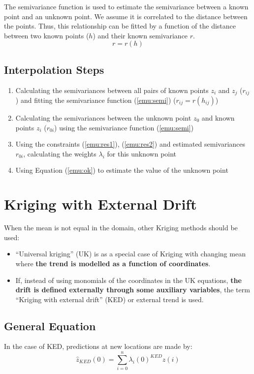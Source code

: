 \documentclass{article}
\begin{document}
The semivariance function is used to estimate the semivariance between a known point and an unknown point. We assume it is correlated to the distance between the points. Thus, this relationship can be fitted by a function of the distance between two known points ($h$) and their known semivariance $r$. 
\begin{equation}
\label{emu:semi}
    r=r(h)
\end{equation}

\subsection{Interpolation Steps}
\begin{enumerate}[1)]
    \item Calculating the semivariances between all pairs of known points $z_i$ and $z_j$ ($r_{ij}$) and fitting the semivariance function (\ref{emu:semi}) ($r_{ij}=r(h_{ij})$)
    \item Calculating the semivariances between the unknown point $z_0$ and known points $z_i$ ($r_{0i}$) using the semivariance function (\ref{emu:semi})
    \item Using the constraints (\ref{emu:res1}), (\ref{emu:res2}) and estimated semivariances $r_{0i}$, calculating the weights $\lambda_i$ for this unknown point
    \item Using Equation (\ref{emu:ok}) to estimate the value of the unknown point
\end{enumerate}

\section{Kriging with External Drift}

When the mean is not equal in the domain, other Kriging methods should be used:
\begin{itemize}
    \item “Universal kriging” (UK) is as a special case of Kriging with changing mean where \textbf{the trend is modelled as a function of coordinates}. 
    \item If, instead of using monomials of the coordinates in the UK equations, \textbf{the drift is defined externally through some auxiliary variables}, the term “Kriging with external drift” (KED) or external trend is used.
\end{itemize}

\subsection{General Equation}
In the case of KED, predictions at new locations are made by:
\begin{equation}
    \hat{z}_{KED}(0)=\sum_{i=0}^{n}\lambda_i(0)^{KED}z(i)
\end{equation}
\end{document}
